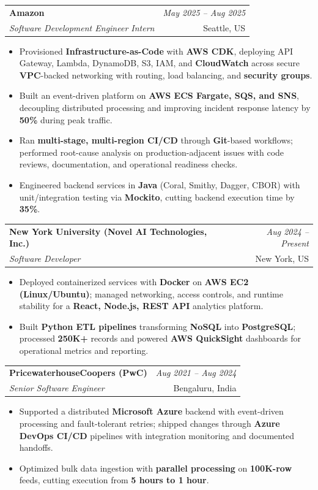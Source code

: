\documentclass[a4paper,10pt]{article}
\makeatletter
\newcommand{\resumeSubheading}[4]{
\vspace{0.3mm}\item
    \begin{tabular*}{0.98\textwidth}[t]{l@{\extracolsep{\fill}}r}
        \textbf{#1} & \textit{\footnotesize{#4}} \\
        \textit{\footnotesize{#3}} & \footnotesize{#2}\\
    \end{tabular*}\vspace{-2mm}
}
\newcommand{\resumeItemListStart}{\begin{itemize}[leftmargin=*, labelsep=1mm, itemsep=0pt]}
\newcommand{\resumeItemListEnd}{\end{itemize}\vspace{-2mm}}
\makeatother
\begin{document}
\resumeSubheading
{Amazon}{Seattle, US}
{Software Development Engineer Intern}{May 2025 -- Aug 2025}
\resumeItemListStart
\item \footnotesize{Provisioned \textbf{Infrastructure-as-Code} with \textbf{AWS CDK}, deploying API Gateway, Lambda, DynamoDB, S3, IAM, and \textbf{CloudWatch} across secure \textbf{VPC}-backed networking with routing, load balancing, and \textbf{security groups}.}
\item \footnotesize{Built an event-driven platform on \textbf{AWS ECS Fargate, SQS, and SNS}, decoupling distributed processing and improving incident response latency by \textbf{50\%} during peak traffic.}
\item \footnotesize{Ran \textbf{multi-stage, multi-region CI/CD} through \textbf{Git}-based workflows; performed root-cause analysis on production-adjacent issues with code reviews, documentation, and operational readiness checks.}
\item \footnotesize{Engineered backend services in \textbf{Java} (Coral, Smithy, Dagger, CBOR) with unit/integration testing via \textbf{Mockito}, cutting backend execution time by \textbf{35\%}.}
\resumeItemListEnd

\resumeSubheading
{New York University (Novel AI Technologies, Inc.)}{New York, US}
{Software Developer}{Aug 2024 -- Present}
\resumeItemListStart
\item \footnotesize{Deployed containerized services with \textbf{Docker} on \textbf{AWS EC2 (Linux/Ubuntu)}; managed networking, access controls, and runtime stability for a \textbf{React, Node.js, REST API} analytics platform.}
\item \footnotesize{Built \textbf{Python ETL pipelines} transforming \textbf{NoSQL} into \textbf{PostgreSQL}; processed \textbf{250K+} records and powered \textbf{AWS QuickSight} dashboards for operational metrics and reporting.}
\resumeItemListEnd

\resumeSubheading
{PricewaterhouseCoopers (PwC)}{Bengaluru, India}
{Senior Software Engineer}{Aug 2021 -- Aug 2024}
\resumeItemListStart
\item \footnotesize{Supported a distributed \textbf{Microsoft Azure} backend with event-driven processing and fault-tolerant retries; shipped changes through \textbf{Azure DevOps CI/CD} pipelines with integration monitoring and documented handoffs.}
\item \footnotesize{Optimized bulk data ingestion with \textbf{parallel processing} on \textbf{100K-row} feeds, cutting execution from \textbf{5 hours to 1 hour}.}
\resumeItemListEnd
\end{document}
